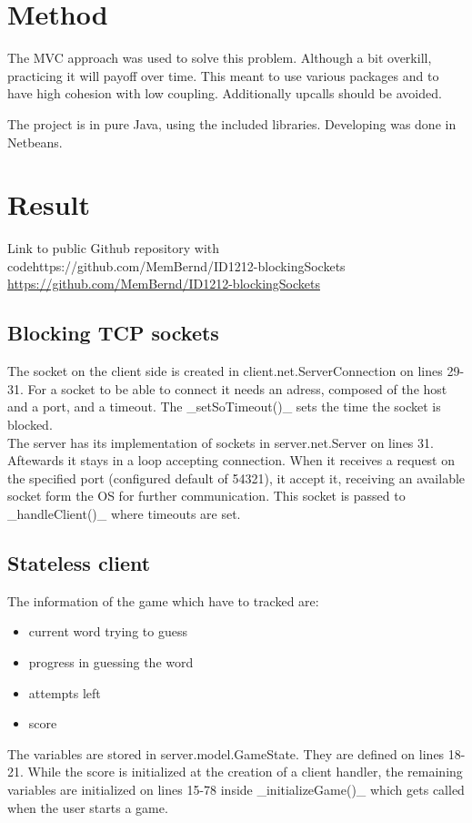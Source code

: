 \documentclass[a4paper]{scrartcl}
\begin{document}
\section{Method}

The MVC approach was used to solve this problem. Although a bit overkill, practicing it will payoff over time.
This meant to use various packages and to have high cohesion with low coupling. Additionally upcalls should be avoided.


The project is in pure Java, using the included libraries.
Developing was done in Netbeans.

\section{Result}


Link to public Github repository with codehttps://github.com/MemBernd/ID1212-blockingSockets
\href{https://github.com/MemBernd/ID1212-blockingSockets}{https://github.com/MemBernd/ID1212-blockingSockets}

\subsection{Blocking TCP sockets}

The socket on the client side is created in client.net.ServerConnection on lines 29-31.
For a socket to be able to connect it needs an adress, composed of the host and a port, and a timeout.
The _setSoTimeout()_ sets the time the socket is blocked.
\\The server has its implementation of sockets in server.net.Server on lines 31.
Aftewards it stays in a loop accepting connection.
When it receives a request on the specified port (configured default of 54321), it accept it, receiving an available socket form the OS for further communication.
This socket is passed to _handleClient()_ where timeouts are set.

\subsection{Stateless client}

The information of the game which have to tracked are:
\begin{itemize}
    \item current word trying to guess
    \item progress in guessing the word
    \item attempts left
    \item score
\end{itemize}
The variables are stored in server.model.GameState.
They are defined on lines 18-21.
While the score is initialized at the creation of a client handler, the remaining variables are initialized on lines 15-78 inside _initializeGame()_ which gets called when the user starts a game.
\end{document}
